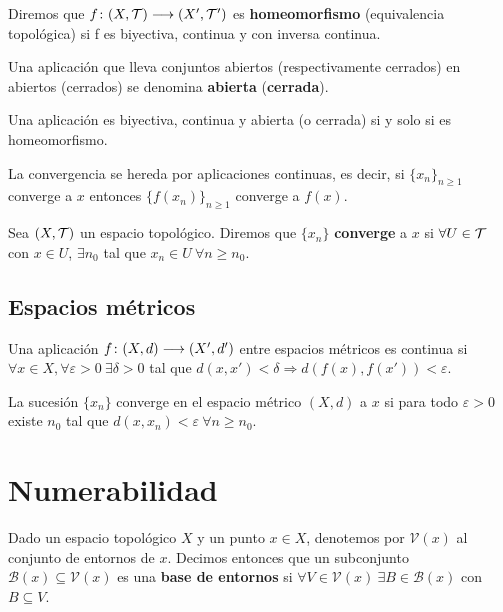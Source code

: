 \documentclass[GTS.tex]{subfiles}
\begin{document}
\begin{defi}Diremos que $f\colon{(X,\mathcal{T})}\longrightarrow{(X',\mathcal{T}')}$ es \textbf{homeomorfismo} (equivalencia topológica) si f es biyectiva, continua y con inversa continua.
\end{defi}

\begin{defi} Una aplicación que lleva conjuntos abiertos (respectivamente cerrados) en abiertos (cerrados) se denomina \textbf{abierta} (\textbf{cerrada}).
\end{defi}


\begin{prop} Una aplicación es biyectiva, continua y abierta (o cerrada) si y solo si es homeomorfismo.
\end{prop}
\begin{prop}
La convergencia se hereda por aplicaciones continuas, es decir, si $\{x_n\}_{n\geq 1}$ converge a $x$ entonces $\{f(x_n)\}_{n\geq 1}$ converge a $f(x)$.
\end{prop}
\begin{defi} Sea $(X,\mathcal{T})$ un espacio topológico. Diremos que $\{x_n\}$ \textbf{converge} a $x$ si $\forall U\in\mathcal{T}$ con $x\in U$, $\exists n_0$ tal que $x_n\in U\ \forall n\geq n_0$.
\end{defi}
\subsection{Espacios métricos}
\begin{prop}
Una aplicación $f\colon{(X,d)}\longrightarrow{(X',d')}$ entre espacios métricos es continua si $\forall x\in X, \forall\varepsilon>0\ \exists\delta>0$ tal que $d(x,x')<\delta\Rightarrow d(f(x),f(x'))<\varepsilon$.
\end{prop}
\begin{prop} La sucesión $\{x_n\}$ converge en el espacio métrico $(X,d)$ a $x$ si para todo $\varepsilon>0$ existe $n_0$ tal que $d(x,x_n)<\varepsilon\ \forall n\geq n_0$.
\end{prop}
\newpage
\section{Numerabilidad}
\begin{defi}
Dado un espacio topológico $X$ y un punto $x\in X$, denotemos por $\mathcal{V}(x)$ al conjunto de entornos de $x$. Decimos entonces que un subconjunto $\mathcal{B}(x)\subseteq\mathcal{V}(x)$ es una \textbf{base de entornos} si $\forall V\in\mathcal{V}(x)\ \exists B\in\mathcal{B}(x)$ con $B\subseteq V$. 
\end{defi}
\end{document}
